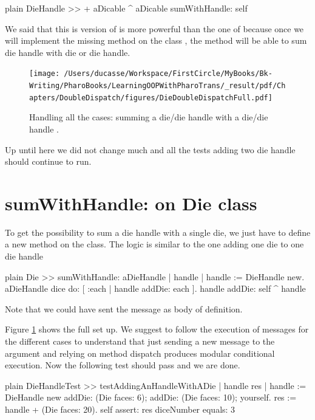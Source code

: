 \documentclass[10pt,twoside,english]{_support/latex/sbabook/sbabook}
\begin{document}
\begin{displaycode}{plain}
DieHandle >> + aDicable
	^ aDicable sumWithHandle: self
\end{displaycode}

We said that this is version of \textcode{+} is more powerful than the one of  because once we will implement the missing method  on the class , the \textcode{+} method will be able to sum die handle with die or die handle. 


\begin{figure}

\begin{center}
\texttt{[image: /Users/ducasse/Workspace/FirstCircle/MyBooks/Bk-Writing/PharoBooks/LearningOOPWithPharoTrans/\_result/pdf/Chapters/DoubleDispatch/figures/DieDoubleDispatchFull.pdf]}\caption{Handling all the cases: summing a die/die handle with a die/die handle .\label{figDieDoubleDispatchFull}}\end{center}
\end{figure}


Up until here we did not change much and all the tests adding two die handle should continue to run. 
\section{sumWithHandle: on Die class}
To get the possibility to sum a die handle with a single die, we just have to define a new method  on the  class. 
The logic is similar to the one adding one die to one die handle

\begin{displaycode}{plain}
Die >> sumWithHandle: aDieHandle
	| handle |
	handle := DieHandle new.
	aDieHandle dice do: [ :each | handle addDie: each ].
	handle addDie: self
	^ handle
\end{displaycode}

Note that we could have  sent the message  as body of  definition.

Figure \ref{figDieDoubleDispatchFull} shows the full set up. We suggest to follow the execution of messages for the different cases to understand that just sending a new message to the argument and relying on method dispatch produces modular conditional execution.
Now the following test should pass and we are done.

\begin{displaycode}{plain}
DieHandleTest >> testAddingAnHandleWithADie
	| handle res |
	handle := DieHandle new
		addDie: (Die faces: 6);
		addDie: (Die faces: 10);
		yourself.
	res := handle + (Die faces: 20).
	self assert: res diceNumber equals: 3
\end{displaycode}
\end{document}
